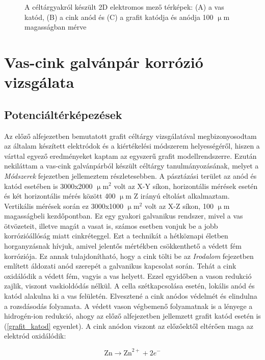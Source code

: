 \begin{figure}
\caption{A céltárgyakról készült 2D elektromos mező térképek:
(A) a vas katód, (B) a cink anód és (C) a grafit katódja és anódja 100 $\upmu$m magasságban mérve}
\label{fig:field_h1}
\end{figure}


\section{Vas-cink galvánpár korrózió vizsgálata}
\subsection{Potenciáltérképezések}
Az előző alfejezetben bemutatott grafit céltárgy vizsgálatával megbizonyosodtam az általam készített elektródok és a kiértékelési módszerem helyességéről, hiszen a várttal egyező eredményeket kaptam az egyszerű grafit modellrendszerre. Ezután nekiláttam a vas-cink galvánpárból készült céltárgy tanulmányozásának, melyet a \emph{Módszerek} fejezetben jellemeztem részletesebben. A pásztázási terület az anód és katód esetében is 3000x2000 $\upmu$m$^2$ volt az X-Y síkon, horizontális mérések esetén és két horizontális mérés között 400 $\upmu$m Z irányú eltolást alkalmaztam. Vertikális mérések során ez 3000x1000 $\upmu$m$^2$ volt az X-Z síkon, 100 $\upmu$m magasságbeli kezdőpontban. Ez egy gyakori galvanikus rendszer, mivel a vas ötvözeteit, illetve magát a vasat is, számos esetben vonjuk be a jobb korrózióállóság miatt cinkréteggel. Ezt a technikát a hétköznapi életben horganyzásnak hívjuk, amivel jelentős mértékben csökkenthető a védett fém korróziója. Ez annak tulajdonítható, hogy a cink tölti be az \emph{Irodalom} fejezetben említett áldozati anód szerepét a galvanikus kapcsolat során. Tehát a cink oxidálódik a védett fém, vagyis a vas helyett. Ezzel egyidőben a vason redukció zajlik, viszont vaskioldódás nélkül. A cella szétkapcsolása esetén, lokális anód és katód alakulna ki a vas felületén. Elvesztené a cink anódos védelmét és elindulna a rozsdásodás folyamata.
A védett vason végbemenő folyamatnak is a lényege a hidrogén-ion redukció, ahogy az előző alfejezetben jellemzett grafit katód esetén is (\ref{grafit_katod} egyenlet). A cink anódon viszont az előzőektől eltérően maga az elektród oxidálódik:


\begin{equation}
\textrm{Zn} \longrightarrow \textrm{Zn}^{2+} + 2e^- 
\label{cink_anod}
\end{equation}


